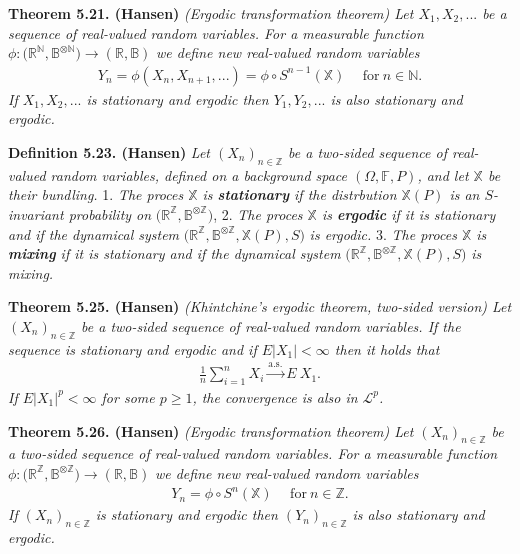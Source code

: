 \documentclass[a4paper,10pt,openany]{book}
\begin{document}
\textbf{Theorem 5.21. (Hansen)} \emph{(Ergodic transformation theorem) Let \(X_1,X_2,...\) be a sequence of real-valued random variables. For a measurable function} \(\phi : \big(\mathbb{R}^{\mathbb{N}},\mathbb{B}^{\otimes\mathbb{N}}\big)\to (\mathbb{R},\mathbb{B})\) \emph{we define new real-valued random variables}
\begin{align*}
    Y_n=\phi(X_n,X_{n+1},...)=\phi\circ S^{n-1}(\mathbb{X})\hspace{15pt}\text{for}\ n\in\mathbb{N}.
\end{align*}
\emph{If \(X_1,X_2,...\) is stationary and ergodic then \(Y_1,Y_2,...\) is also stationary and ergodic.}

\textbf{Definition 5.23. (Hansen)} \emph{Let \((X_n)_{n\in\mathbb{Z}}\) be a two-sided sequence of real-valued random variables, defined on a background space \((\Omega,\mathbb{F},P)\), and let \(\mathbb{X}\) be their bundling.}
1. \emph{The proces \(\mathbb{X}\) is \textbf{stationary} if the distrbution \(\mathbb{X}(P)\) is an \(S\)-invariant probability on} \(\Big(\mathbb{R}^{\mathbb{Z}},\mathbb{B}^{\otimes \mathbb{Z}}\Big)\),
2. \emph{The proces \(\mathbb{X}\) is \textbf{ergodic} if it is stationary and if the dynamical system} \(\Big(\mathbb{R}^{\mathbb{Z}},\mathbb{B}^{\otimes \mathbb{Z}},\mathbb{X}(P),S\Big)\) \emph{is ergodic.}
3. \emph{The proces \(\mathbb{X}\) is \textbf{mixing} if it is stationary and if the dynamical system} \(\Big(\mathbb{R}^{\mathbb{Z}},\mathbb{B}^{\otimes \mathbb{Z}},\mathbb{X}(P),S\Big)\) \emph{is mixing.}

\textbf{Theorem 5.25. (Hansen)} \emph{(Khintchine's ergodic theorem, two-sided version) Let \((X_n)_{n\in\mathbb{Z}}\) be a two-sided sequence of real-valued random variables. If the sequence is stationary and ergodic and if \(E\vert X_1\vert <\infty\) then it holds that}
\begin{align*}
    \frac{1}{n}\sum_{i=1}^nX_i\stackrel{\text{a.s.}}{\to} E\ X_1.\tag{5.30}
\end{align*}
\emph{If \(E\vert X_1\vert^p<\infty\) for some \(p\ge 1\), the convergence is also in \(\mathcal{L}^p\).}

\textbf{Theorem 5.26. (Hansen)} \emph{(Ergodic transformation theorem) Let \((X_n)_{n\in\mathbb{Z}}\) be a two-sided sequence of real-valued random variables. For a measurable function} \(\phi : \big(\mathbb{R}^{\mathbb{Z}},\mathbb{B}^{\otimes\mathbb{Z}}\big)\to (\mathbb{R},\mathbb{B})\) \emph{we define new real-valued random variables}
\begin{align*}
    Y_n=\phi\circ S^{n}(\mathbb{X})\hspace{15pt}\text{for}\ n\in\mathbb{Z}.
\end{align*}
\emph{If \((X_n)_{n\in\mathbb{Z}}\) is stationary and ergodic then \((Y_n)_{n\in\mathbb{Z}}\) is also stationary and ergodic.}
\end{document}

